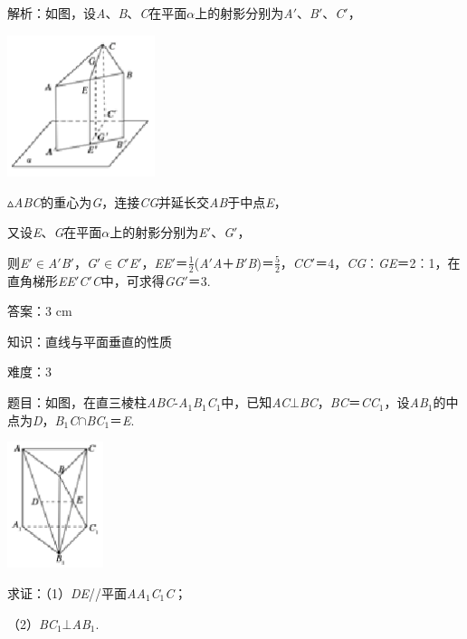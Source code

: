 \documentclass{article} %
\begin{document}
解析：如图，设\textit{A}、\textit{B}、\textit{C}在平面\textit{$\alpha$}上的射影分别为\textit{A}$'$、\textit{B}$'$、\textit{C}$'$，

\includegraphics*[width=1.70in, height=1.63in, keepaspectratio=false]{image244}

$\mathrm{\vartriangle}$\textit{ABC}的重心为\textit{G}，连接\textit{CG}并延长交\textit{AB}于中点\textit{E}，

又设\textit{E}、\textit{G}在平面\textit{$\alpha$}上的射影分别为\textit{E}$'$、\textit{G}$'$，

则\textit{E}$'$$\mathrm{\in}$\textit{A}$'$\textit{B}$'$，\textit{G}$'$$\mathrm{\in}$\textit{C}$'$\textit{E}$'$，\textit{EE}$'$＝$\frac{1}{2}$(\textit{A}$'$\textit{A}＋\textit{B}$'$\textit{B})＝$\frac{5}{2}$，\textit{CC}$'$＝4，\textit{CG}︰\textit{GE}＝2︰1，在直角梯形\textit{EE}$'$\textit{C}$'$\textit{C}中，可求得\textit{GG}$'$＝3.

答案：3 cm

知识：直线与平面垂直的性质

难度：3

题目：如图，在直三棱柱\textit{ABC}-\textit{A}${}_{1}$\textit{B}${}_{1}$\textit{C}${}_{1}$中，已知\textit{AC}$\mathrm{\bot}$\textit{BC}，\textit{BC}＝\textit{CC}${}_{1}$，设\textit{AB}${}_{1}$的中点为\textit{D}，\textit{B}${}_{1}$\textit{C}$\mathrm{\cap}$\textit{BC}${}_{1}$＝\textit{E}.

\includegraphics*[width=1.10in, height=1.45in, keepaspectratio=false]{image245}

求证：（1）\textit{DE}//平面\textit{AA}${}_{1}$\textit{C}${}_{1}$\textit{C}；

（2）\textit{BC}${}_{1}$$\mathrm{\bot}$\textit{AB}${}_{1}$.
\end{document}

